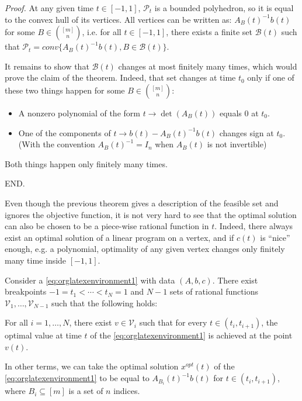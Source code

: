 \documentclass[moor]{informs1}
\renewenvironment{proof}{\emph{Proof.}}{END.}
\begin{document}
\begin{proof}
At any given time \(t \in [-1, 1]\), \(\mathcal P_t\) is a bounded polyhedron, so it is equal to the convex hull of its vertices. All vertices can be written as: \(A_B(t)^{-1}b(t)\) for some \(B \in  {[m] \choose n}\), i.e. for all \(t \in [-1, 1]\), there exists a finite set \(\mathcal B(t)\) such that \(\mathcal P_t = conv\{A_B(t)^{-1}b(t), B \in \mathcal B(t)\}\).

It remains to show that \(\mathcal B(t)\) changes at most finitely many times, which would prove the claim of the theorem. Indeed, that set changes at time \(t_0\) only if one of these two things happen for some \(B \in  {[m] \choose n}\):
\begin{itemize}
\item A nonzero polynomial of the form \(t \rightarrow \det(A_B(t))\) equals \(0\) at \(t_0\).
\item One of the components of \(t \rightarrow b(t) - A_B(t)^{-1}b(t)\) changes sign at \(t_0\). (With the convention \(A_B(t)^{-1} = I_n\) when \(A_B(t)\) is not invertible)
\end{itemize}
Both things happen only finitely many times.
\label{orgspecialblock11}

\end{proof}

Even though the previous theorem gives a description of the feasible set and ignores the objective function, it is not very hard to see that the optimal solution can also be chosen to be a piece-wise rational function in \(t\). Indeed, there always exist an optimal solution of a linear program on a vertex, and if \(c(t)\) is ``nice'' enough, e.g. a polynomial, optimality of any given vertex changes only finitely many time inside \([-1, 1]\).

\begin{thm}
Consider a \ref{eq:orglatexenvironment1} with data \((A, b, c)\). There exist breakpoints \(-1 = t_1 < \cdots < t_N = 1\) and \(N-1\) sets of rational functions \(\mathcal V_1, \ldots, \mathcal V_{N-1}\) such that the following holds:

For all \(i = 1, \ldots, N\), there exist \(v \in \mathcal V_i\) such that for every \(t \in (t_i, t_{i+1})\), the optimal value at time \(t\) of the \ref{eq:orglatexenvironment1} is achieved at the point \(v(t)\).

In other terms, we can take the optimal solution  \(x^{opt}(t)\) of the \ref{eq:orglatexenvironment1} to be equal to \(A_{B_i}(t)^{-1}b(t)\) for \(t \in (t_i, t_{i+1})\), where \(B_i \subseteq [m]\) is a set of \(n\) indices.
\label{orgspecialblock12}

\end{thm}
\end{document}
